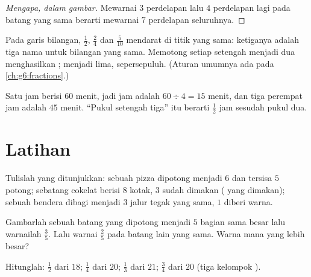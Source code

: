 \begin{proof}[Mengapa, dalam gambar]
Mewarnai $3$ perdelapan lalu $4$ perdelapan lagi pada batang yang
sama berarti mewarnai $7$ perdelapan seluruhnya.
\end{proof}

\begin{example}\label{ex:g4:fractions:equal}
Pada garis bilangan, $\frac12$, $\frac24$ dan $\frac{5}{10}$
mendarat di titik yang sama: ketiganya adalah tiga nama untuk
bilangan yang sama. Memotong setiap setengah menjadi dua
menghasilkan ; menjadi lima, sepersepuluh. (Aturan umumnya
ada pada \cref{ch:g6:fractions}.)
\end{example}

\begin{example}\label{ex:g4:fractions:hour}
Satu jam berisi $60$ menit, jadi  jam adalah
$60 \div 4 = 15$ menit, dan tiga perempat jam adalah $45$ menit.
``Pukul setengah tiga'' itu berarti $\frac12$ jam sesudah pukul dua.
\end{example}

\section{Latihan}

\begin{exercise}[$\star$]\label{exo:g4:fractions:1}
Tulislah  yang ditunjukkan: sebuah pizza dipotong menjadi $6$
dan tersisa $5$ potong; sebatang cokelat berisi $8$ kotak, $3$ sudah
dimakan ( yang dimakan); sebuah bendera dibagi menjadi $3$
jalur tegak yang sama, $1$ diberi warna.
\end{exercise}

\begin{exercise}[$\star$]\label{exo:g4:fractions:2}
Gambarlah sebuah batang yang dipotong menjadi $5$ bagian sama besar
lalu warnailah $\frac35$. Lalu warnai $\frac{2}{5}$ pada batang lain yang sama. Warna mana yang lebih besar?
\end{exercise}

\begin{exercise}[$\star$]\label{exo:g4:fractions:3}
Hitunglah: $\frac12$ dari $18$; \quad $\frac14$ dari $20$; \quad
$\frac13$ dari $21$; \quad $\frac34$ dari $20$ (tiga kelompok
).
\end{exercise}


